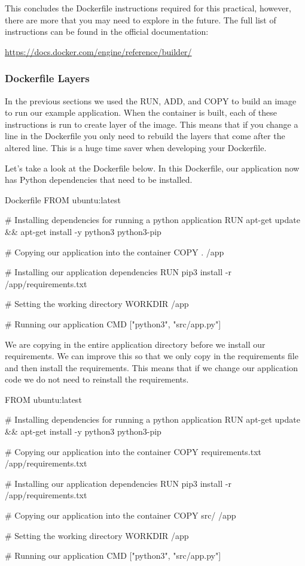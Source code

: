 \documentclass{csse4400}
\begin{document}
This concludes the Dockerfile instructions required for this practical,
however, there are more that you may need to explore in the future.
The full list of instructions can be found in the official documentation:

\url{https://docs.docker.com/engine/reference/builder/}

\subsubsection{Dockerfile Layers}

In the previous sections we used the RUN, ADD, and COPY to build an image to run our example application.
When the container is built, each of these instructions is run to create layer of the image.
This means that if you change a line in the Dockerfile you only need to rebuild the layers that come after the altered line.
This is a huge time saver when developing your Dockerfile.

Let's take a look at the Dockerfile below.
In this Dockerfile, our application now has Python dependencies that need to be installed.

\begin{code}[language=docker,numbers=none]{Dockerfile}
FROM ubuntu:latest

# Installing dependencies for running a python application
RUN apt-get update && apt-get install -y python3 python3-pip

# Copying our application into the container
COPY . /app

# Installing our application dependencies
RUN pip3 install -r /app/requirements.txt

# Setting the working directory
WORKDIR /app

# Running our application
CMD ["python3", "src/app.py"]
\end{code}

We are copying in the entire application directory before we install our requirements.
We can improve this so that we only copy in the requirements file and then install the requirements.
This means that if we change our application code we do not need to reinstall the requirements.

\begin{code}[language=docker,numbers=none]{}
FROM ubuntu:latest

# Installing dependencies for running a python application
RUN apt-get update && apt-get install -y python3 python3-pip

# Copying our application into the container
COPY requirements.txt /app/requirements.txt

# Installing our application dependencies
RUN pip3 install -r /app/requirements.txt

# Copying our application into the container
COPY src/ /app

# Setting the working directory
WORKDIR /app

# Running our application
CMD ["python3", "src/app.py"]
\end{code}
\end{document}

